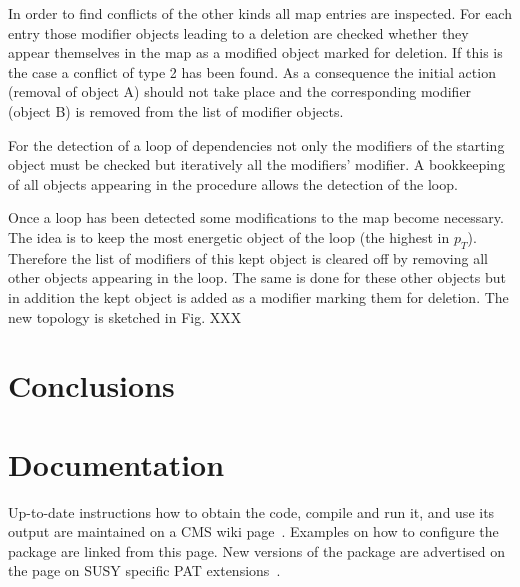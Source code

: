 \documentclass{cmspaper}
\begin{document}
In order to find conflicts of the other kinds all map entries are inspected. For
each entry those modifier objects leading to a deletion are checked whether they
appear themselves in the map as a modified object marked for deletion. If this
is the case a conflict of type 2 has been found. As a consequence the initial
action (removal of object A)  should not take place and the corresponding
modifier (object B) is removed from the list of modifier objects.

For the detection of a loop of dependencies not only the modifiers of the
starting object must be checked but iteratively all the modifiers' modifier. A
bookkeeping of all objects appearing in the procedure allows the detection of
the loop.

Once a loop has been detected some modifications to the map become necessary.
The idea is to keep the most energetic object of the loop (the highest in
$p_T$). Therefore the list of modifiers of this kept object is cleared off by
removing all other objects appearing in the loop. %
The same is done for these other objects but in addition the kept object is
added as a modifier marking them for deletion. The new topology is sketched in
Fig. XXX %

\clearpage
\section{Conclusions}


\clearpage
\section{Documentation}
Up-to-date instructions how to obtain the code, compile and run it, and use its
output are maintained on a CMS wiki page~\cite{twiki}. Examples on how to
configure the package are linked from this page. New versions of the package are
advertised on the page on SUSY specific PAT extensions~\cite{susypat}.




\clearpage
\end{document}
